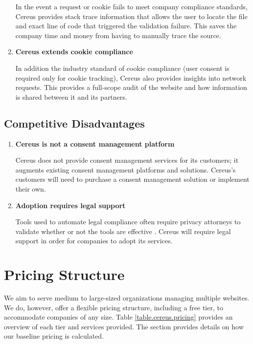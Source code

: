 \begin{enumerate}
  In the event a request or cookie fails to meet company compliance standards, Cereus provides stack trace information that allows the user to locate the file and exact line of code that triggered the validation failure. This saves the company time and money from having to manually trace the source.

  \item \textbf{Cereus extends cookie compliance}

  In addition the industry standard of cookie compliance (user consent is required only for cookie tracking), Cereus also provides insights into network requests. This provides a full-scope audit of the website and how information is shared between it and its partners.

\end{enumerate}

\subsection{Competitive Disadvantages}

\begin{enumerate}

  \item \textbf{Cereus is not a consent management platform}

  Cereus does not provide consent management services for its customers; it augments existing consent management platforms and solutions. Cereus's customers will need to purchase a consent management solution or implement their own.

  \item \textbf{Adoption requires legal support}

  Tools used to automate legal compliance often require privacy attorneys to validate whether or not the tools are effective \cite{bloomlaw.2019}. Cereus will require legal support in order for companies to adopt its services.

\end{enumerate}

\section{Pricing Structure}

We aim to serve medium to large-sized organizations managing multiple websites. We do, however, offer a flexible pricing structure, including a free tier, to accommodate companies of any size. Table \ref{table.cereus.pricing} provides an overview of each tier and services provided. The  section provides details on how our baseline pricing is calculated.

